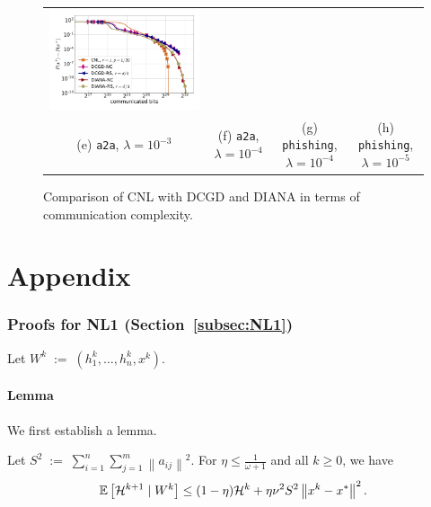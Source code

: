 \documentclass[12pt]{article}
\newcommand{\eqdef}{\; { := }\;}
\newcommand{\ExpBr}[1]{\mathbb{E}\left[#1\right]}
\newcommand{\norm}[1]{\left\|#1\right\|}
\begin{document}
\begin{figure}[ht]
\begin{center}
{\begin{tabular}{cccc}
				\includegraphics[width = 0.23 \textwidth]{LogReg/phishing/Lambda=1e-5/phishing_cnl_diana_dcgd_lmb=0.00001.pdf}
				\\
				(e) {\tt a2a}, $\lambda=10^{-3}$ &(f) {\tt a2a}, $\lambda=10^{-4}$ & (g) {\tt phishing}, $\lambda=10^{-4}$ &(h) {\tt phishing}, $\lambda=10^{-5}$
		\end{tabular}}
		\caption{Comparison of {\sf CNL} with DCGD and DIANA in terms of communication complexity.}
		\label{exp:dcgd_diana}
	\end{center}
	\vskip -0.2in
\end{figure}










\clearpage

\appendix


\part*{Appendix}



\section{Proofs for {\sf NL1} (Section~\ref{subsec:NL1})}


Let $W^k \eqdef (h_1^k, \dots, h_n^k, x^k)$.


\subsection{Lemma}

We first establish a lemma.

\begin{lemma}\label{lm:calHk} Let $S^2\eqdef \sum_{i=1}^n \sum_{j=1}^m \norm{a_{ij}}^2$. For $\eta \leq \frac{1}{\omega+1}$ and all $k\geq 0$, we have 
$$
\ExpBr{ {\cal H}^{k+1} \;|\; W^k} \leq  (1-\eta) {\cal H}^k +  \eta \nu^2 S^2 \norm{x^k - x^*}^2.
$$
\end{lemma}
\end{document}
